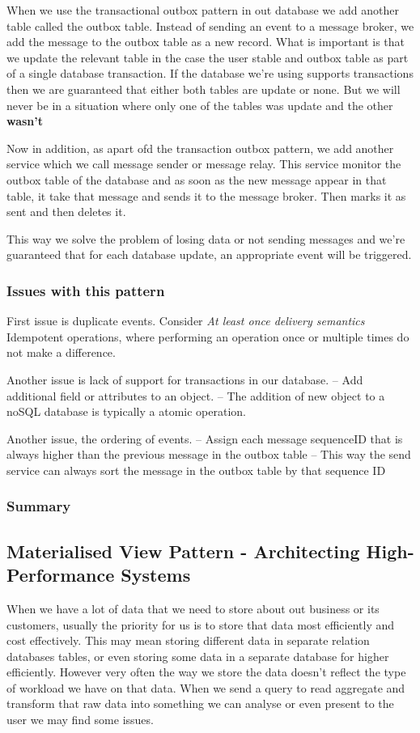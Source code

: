 When we use the transactional outbox pattern in out database we add another table called the outbox table.
Instead of sending an event to a message broker, we add the message to the outbox table as a new record.
What is important is that we update the relevant table in the case the user stable and outbox table as part of a single database transaction.
If the database we're using supports transactions then we are guaranteed that either both tables are update or none.
But we will never be in a situation where only one of the tables was update and the other \textbf{wasn't}

Now in addition, as apart ofd the transaction outbox pattern, we add another service which we call message sender or message relay.
This service monitor the outbox table of the database and as soon as the new message appear in that table, it take that message and sends it to the message broker.
Then marks it as sent and then deletes it.

This way we solve the problem of losing data or not sending messages and we're guaranteed that for each database update, an appropriate event will be triggered.

\subsubsection{Issues with this pattern}
First issue is duplicate events.
Consider \textit{At least once delivery semantics}
Idempotent operations, where performing an operation once or multiple times do not make a difference.

Another issue is lack of support for transactions in our database.
-- Add additional field or attributes to an object.
-- The addition of new object to a noSQL database is typically a atomic operation.

Another issue, the ordering of events.
-- Assign each message sequenceID that is always higher than the previous message in the outbox table
-- This way the send service can always sort the message in the outbox table by that sequence ID

\subsubsection{Summary}

\subsection{Materialised View Pattern - Architecting High-Performance Systems}
When we have a lot of data that we need to store about out business or its customers, usually the priority for us is to store that data most efficiently and cost effectively.
This may mean storing different data in separate relation databases tables, or even storing some data in a separate database for higher efficiently.
However very often the way we store the data doesn't reflect the type of workload we have on that data.
When we send a query to read aggregate and transform that raw data into something we can analyse or even present to the user we may find some issues.

